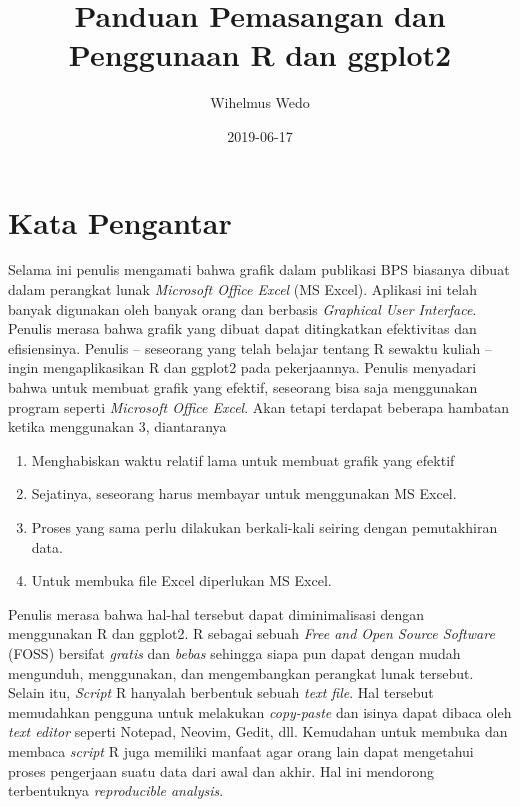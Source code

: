 \documentclass[]{book}
\title{Panduan Pemasangan dan Penggunaan R dan ggplot2}
\author{Wihelmus Wedo}
\date{2019-06-17}
\providecommand{\tightlist}{%
  \setlength{\itemsep}{0pt}\setlength{\parskip}{0pt}}
\begin{document}
\maketitle

{
\setcounter{tocdepth}{1}
\tableofcontents
}
\chapter*{Kata Pengantar}\label{kata-pengantar}

Selama ini penulis mengamati bahwa grafik dalam publikasi BPS biasanya
dibuat dalam perangkat lunak \emph{Microsoft Office Excel} (MS Excel).
Aplikasi ini telah banyak digunakan oleh banyak orang dan berbasis
\emph{Graphical User Interface}. Penulis merasa bahwa grafik yang dibuat
dapat ditingkatkan efektivitas dan efisiensinya. Penulis -- seseorang
yang telah belajar tentang R sewaktu kuliah -- ingin mengaplikasikan R
dan ggplot2 pada pekerjaannya. Penulis menyadari bahwa untuk membuat
grafik yang efektif, seseorang bisa saja menggunakan program seperti
\emph{Microsoft Office Excel}. Akan tetapi terdapat beberapa hambatan
ketika menggunakan 3, diantaranya

\begin{enumerate}
\def\labelenumi{\arabic{enumi}.}
\tightlist
\item
  Menghabiskan waktu relatif lama untuk membuat grafik yang efektif
\item
  Sejatinya, seseorang harus membayar untuk menggunakan MS Excel.
\item
  Proses yang sama perlu dilakukan berkali-kali seiring dengan
  pemutakhiran data.
\item
  Untuk membuka file Excel diperlukan MS Excel.
\end{enumerate}

Penulis merasa bahwa hal-hal tersebut dapat diminimalisasi dengan
menggunakan R dan ggplot2. R sebagai sebuah \emph{Free and Open Source
Software} (FOSS) bersifat \emph{gratis} dan \emph{bebas} sehingga siapa
pun dapat dengan mudah mengunduh, menggunakan, dan mengembangkan
perangkat lunak tersebut. Selain itu, \emph{Script} R hanyalah berbentuk
sebuah \emph{text file}. Hal tersebut memudahkan pengguna untuk
melakukan \emph{copy-paste} dan isinya dapat dibaca oleh \emph{text
editor} seperti Notepad, Neovim, Gedit, dll. Kemudahan untuk membuka dan
membaca \emph{script} R juga memiliki manfaat agar orang lain dapat
mengetahui proses pengerjaan suatu data dari awal dan akhir. Hal ini
mendorong terbentuknya \emph{reproducible analysis}.
\end{document}
